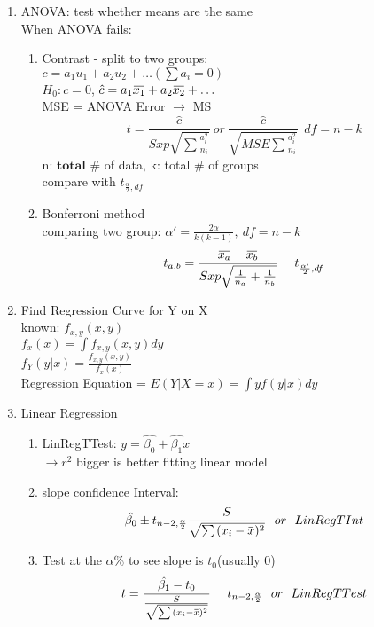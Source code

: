 \documentclass[10pt]{article}
\newcommand{\overbar}[1]{\mkern 1.5mu\overline{\mkern-1.5mu#1\mkern-1.5mu}\mkern 1.5mu}
\begin{document}
\begin{multicols}{2}
\begin{enumerate}
\item ANOVA: test whether means are the same\\
When ANOVA fails:
\begin{enumerate}
\item Contrast - split to two groups:\\
	$c = a_1u_1 + a_2u_2 + \dots (\sum a_i = 0)$ \\
	$H_0: c = 0$, $\hat{c} = a_1\overbar{x_1}+a_2\overbar{x_2}+\dots$\\
	MSE = ANOVA Error $\rightarrow$ MS\\
	$$t = \frac{\hat{c}}{Sxp \sqrt{\sum \frac {a_i^2}{n_i}}} \ or \  \frac{\hat{c}}{\sqrt{MSE \sum \frac {a_i^2}{n_i}}} \ \ df = n-k$$
	n: $\mathbf{total}$ $\#$ of data, k: total $\#$ of groups\\
	compare with $t_{\frac{\alpha}{2},df}$
\item Bonferroni method\\
	comparing two group:
	$\alpha ' = \frac{2\alpha}{k(k-1)}, \ df = n-k$\\
	$$t_{a,b} = \frac{\overbar{x_a}- \overbar{x_b}}{Sxp \sqrt{\frac{1}{n_a}+\frac{1}{n_b}}} \ \ \ \  t_{\frac{\alpha'}{2},df}$$
\end{enumerate}

\item Find Regression Curve for Y on X\\
known: $f_{x,y}(x,y)$\\
$f_x(x) = \int f_{x,y}(x,y)dy$\\
$f_Y(y|x) = \frac{f_{x,y}(x,y)}{f_x(x)}$\\
Regression Equation = $E(Y|X = x) = \int y  f(y|x)dy$

\item Linear Regression
\begin{enumerate}
\item LinRegTTest: $y = \hat{\beta_0} + \hat{\beta_1}x$\\
	$\rightarrow r^2$ bigger is better fitting linear model

\item slope confidence Interval:\\
	$$\hat{\beta_0} \pm t_{n-2, \frac{\alpha}{2}}\frac{S}{\sqrt{\sum{(x_i-\overbar{x})^2}}}\ \ or\ \ LinRegTInt $$
	
\item Test at the $\alpha$\% to see slope is $t_0$(usually 0)\\
$$ t = \frac{\hat{\beta_1}-t_0}{\frac{S}{\sqrt{\sum{(x_i-\overbar{x})^2}}}} \ \ \ \  t_{n-2, \frac{\alpha}{2}} \ \ or \ \ LinRegTTest$$


\end{enumerate}
\end{enumerate}
\end{multicols}
\end{document}
